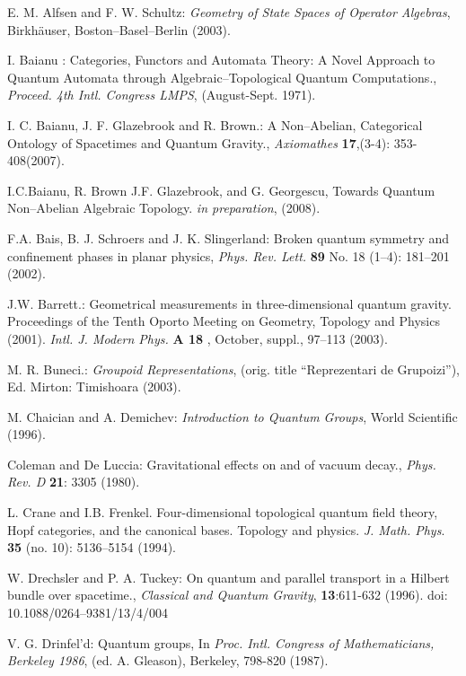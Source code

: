 \documentclass[12pt]{article}
\theoremstyle{plain}
\theoremstyle{definition}
\numberwithin{equation}{section}
\begin{document}
\begin{thebibliography}{9}

E. M. Alfsen and F. W. Schultz: \emph{Geometry of State Spaces of Operator Algebras}, Birkh\"auser, Boston--Basel--Berlin (2003).

I. Baianu : Categories, Functors and Automata Theory: A Novel Approach to Quantum Automata through Algebraic--Topological Quantum Computations., \textit{Proceed. 4th Intl. Congress LMPS}, (August-Sept. 1971).

I. C. Baianu, J. F. Glazebrook and R. Brown.: A Non--Abelian, Categorical Ontology of Spacetimes and Quantum Gravity., \emph{Axiomathes} \textbf{17},(3-4): 353-408(2007).

I.C.Baianu, R. Brown J.F. Glazebrook, and G. Georgescu, Towards Quantum Non--Abelian Algebraic Topology. \textit{in preparation}, (2008).

F.A. Bais, B. J. Schroers and J. K. Slingerland: Broken quantum symmetry and confinement phases in planar physics, \emph{Phys. Rev. Lett.} \textbf{89} No. 18 (1--4): 181--201 (2002).

J.W. Barrett.: Geometrical measurements in three-dimensional quantum gravity.
Proceedings of the Tenth Oporto Meeting on Geometry, Topology and Physics (2001).
\textit{Intl. J. Modern Phys.} \textbf{A 18} , October, suppl., 97--113 (2003).

M. R. Buneci.: \emph{Groupoid Representations}, (orig. title ``Reprezentari de Grupoizi''),
Ed. Mirton: Timishoara (2003). 

M. Chaician and A. Demichev: \emph{Introduction to Quantum Groups}, World Scientific (1996).

Coleman and De Luccia: Gravitational effects on and of vacuum decay., \emph{Phys. Rev. D} \textbf{21}: 3305 (1980).

L. Crane and I.B. Frenkel. Four-dimensional topological quantum field theory, Hopf categories, and the canonical bases. Topology and physics. \textit{J. Math. Phys}. \textbf{35} (no. 10): 5136--5154 (1994).

W. Drechsler and P. A. Tuckey:  On quantum and parallel transport in a Hilbert bundle over spacetime., \emph{Classical and Quantum Gravity}, \textbf{13}:611-632 (1996).
doi: 10.1088/0264--9381/13/4/004

V. G. Drinfel'd: Quantum groups, In \emph{Proc. Intl. Congress of
Mathematicians, Berkeley 1986}, (ed. A. Gleason), Berkeley, 798-820 (1987).


\end{thebibliography}
\end{document}
